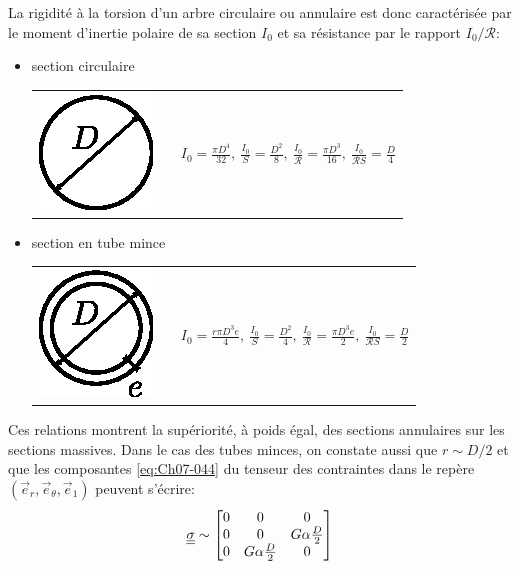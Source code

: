 La rigidité à la torsion d'un arbre circulaire ou annulaire est donc caractérisée par le moment d'inertie polaire de sa section $I_0$ et sa résistance par le rapport $I_0/\mathcal{R}$:
\begin{itemize}
\item section circulaire\\[5pt]
\begin{tabular}{m{2cm}p{1cm}m{8cm}}
        \includegraphics{../images/T1_Ch07-12}&&
        $\displaystyle I_0 = \frac{\pi D^4}{32},\ \frac{I_0}{S} = \frac{D^2}{8},\ \frac{I_0}{\mathcal{R}} = \frac{\pi D^3}{16},\ \frac{I_0}{\mathcal{R} S} = \frac{D}{4}$
\end{tabular}

\item section en tube mince\\[5pt]
\begin{tabular}{m{2cm}p{1cm}m{8cm}}
        \includegraphics{../images/T1_Ch07-13}&&
        $\displaystyle     I_0 = \frac{r\pi D^3 e}{4},\ \frac{I_0}{S} = \frac{D^2}{4},\ \frac{I_0}{\mathcal{R}} = \frac{\pi D^3 e}{2},\ \frac{I_0}{\mathcal{R} S} = \frac{D}{2}$
\end{tabular}

\end{itemize}
Ces relations montrent la supériorité, à poids égal, des sections annulaires sur les sections massives.
Dans le cas des tubes minces, on constate aussi que $r \sim D/2$ et que les composantes \eqref{eq:Ch07-044} du tenseur des contraintes dans le repère $\left( \vec{e}_r, \vec{e}_{\theta}, \vec{e}_1 \right)$ peuvent s'écrire:
\begin{equation}
    \underline{\underline{\sigma}} \sim
    \begin{bmatrix}
        0 & 0 & 0 \\
        0 & 0 & G \alpha \frac{D}{2} \\
        0 & G\alpha \frac{D}{2} & 0
    \end{bmatrix}
\end{equation}

